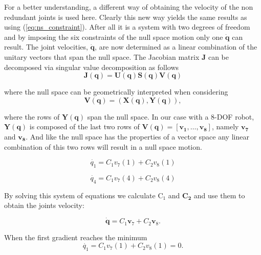 For a better understanding, a different way of obtaining the velocity of the non redundant joints is used here. Clearly this new way yields the same results as using  (\ref{eq:ns_constraint}). After all it is a system with two degrees of freedom and by imposing the six constraints of the null space motion only one $\mathbf{\dot{q}}$ can result.
The joint velocities, $\dot{\mathbf{q}}$, are now determined as a linear combination of the unitary vectors that span the null space.
The Jacobian matrix $\mathbf{J}$ can be decomposed via singular value decomposition \cite{svd} as follows
\begin{equation}
\mathbf{J}(\mathbf{q})=\mathbf{U}(\mathbf{q}) \mathbf{S}(\mathbf{q}) \mathbf{V}(\mathbf{q})
\label{eq:svd}
\end{equation}

where the null space can be geometrically interpreted when considering 
\begin{equation}
\mathbf{V}(\mathbf{q})=(\mathbf{X}(\mathbf{q}),\mathbf{Y}(\mathbf{q})) ,
\label{eq:4.32Dietrich}
\end{equation}

where the rows of $\mathbf{Y}(\mathbf{q})$ span the null space. In our case with a 8-DOF robot, $\mathbf{Y}(\mathbf{q})$  is composed of the last two rows of $\mathbf{V}(\mathbf{q}) = [ \mathbf{v_1}, \dots , \mathbf{v_8}]$, namely $\mathbf{v_7}$ and $\mathbf{v_8}$. And like the null space has the properties of a vector space any linear combination of this two rows will result in a null space motion. 

\begin{equation}
\dot{q_1}  = C_1 v_7(1) + C_2 v_8(1) 
\label{eq:}
\end{equation}

\begin{equation}
\dot{q_4} = C_1 v_7(4) + C_2 v_8(4)
\label{eq:}
\end{equation}



By solving this system of equations we calculate $\mathrm{C_1}$ and $\mathbf{C_2}$ and use them to obtain the joints velocity:

\begin{equation}
\mathbf{\dot{q}} = C_1 \mathbf{v}_7 + C_2 \mathbf{v}_8 .
\label{eq:}
\end{equation}

When the first gradient reaches the minimum \begin{equation}
\dot{q_1}  = C_1 v_7(1) + C_2 v_8(1) = 0 .
\label{eq:}
\end{equation}

